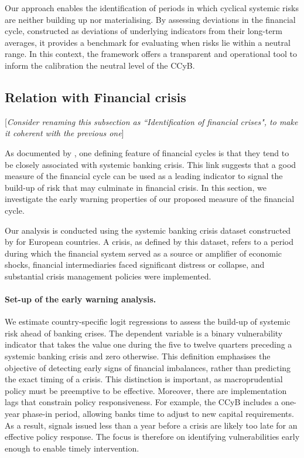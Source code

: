 Our approach enables the identification of periods in which cyclical systemic risks are neither building up nor materialising. By assessing deviations in the financial cycle, constructed as deviations of underlying indicators from their long-term averages, it provides a benchmark for evaluating when risks lie within a neutral range. In this context, the framework offers a transparent and operational tool to inform the calibration the neutral level of the CCyB. 

\subsection{Relation with Financial crisis}

{\color{blue} [\textit{Consider renaming this subsection as ``Identification of financial crises", to make it coherent with the previous one}]}

As documented by \citet{borio2014financial}, one defining feature of financial cycles is that they tend to be closely associated with systemic banking crisis. This link suggests that a good measure of the financial cycle can be used as a leading indicator to signal the build-up of risk that may culminate in financial crisis. In this section, we investigate the early warning properties of our proposed measure of the financial cycle. 

Our analysis is conducted using the systemic banking crisis dataset constructed by \cite{lo2017new} for European countries. A crisis, as defined by this dataset, refers to a period during which the financial system served as a source or amplifier of economic shocks, financial intermediaries faced significant distress or collapse, and substantial crisis management policies were implemented. 

\paragraph{Set-up of the early warning analysis.} We estimate country-specific logit regressions to assess the build-up of systemic risk ahead of banking crises. The dependent variable is a binary vulnerability indicator that takes the value one during the five to twelve quarters preceding a systemic banking crisis and zero otherwise. This definition emphasises the objective of detecting early signs of financial imbalances, rather than predicting the exact timing of a crisis. This distinction is important, as macroprudential policy must be preemptive to be effective. Moreover, there are implementation lags that constrain policy responsiveness. For example, the CCyB includes a one-year phase-in period, allowing banks time to adjust to new capital requirements. As a result, signals issued less than a year before a crisis are likely too late for an effective policy response. The focus is therefore on identifying vulnerabilities early enough to enable timely intervention.

